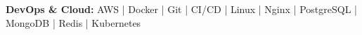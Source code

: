 \textbf{DevOps \& Cloud:} AWS | Docker | Git | CI/CD | Linux | Nginx | PostgreSQL | MongoDB | Redis | Kubernetes
